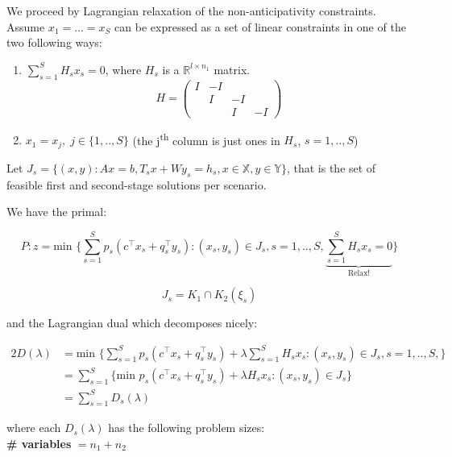 We proceed by Lagrangian relaxation of the non-anticipativity constraints.
Assume $x_1 = ...= x_S$ can be expressed as a set of linear constraints in one of the
two following ways:

\begin{enumerate}
\item $\sum_{s=1}^S H_sx_s = 0$, where $H_s$ is a $\mathbb{R}^{l\times n_1}$ matrix.
      \[ H = \left( \begin{array}{rrrr}
      I & -I &    & \\
        &  I & -I & \\
        &    &  I & -I \end{array} \right)\]
\item $x_1 = x_j,\; j\in \{1,..,S\}$ (the j\textsuperscript{th} column is just ones in $H_s$, $s=1,..,S$)
\end{enumerate}

Let $J_s = \{ (x,y) : Ax=b, T_s x + Wy_s = h_s, x \in \mathbb{X}, y\in \mathbb{Y} \}$, that is the set of
feasible first and second-stage solutions per scenario.

We have the primal:

\begin{equation}\label{eq:lgprimal}
P: z = \textrm{min }\{ \sum_{s=1}^S p_s (c^\top x_s + q_s^\top y_s) : (x_s, y_s) \in J_s, s=1,..,S, 
\underbrace{\sum_{s=1}^S H_sx_s = 0}_{\textrm{Relax!}}\}
\end{equation}

\begin{equation*}
J_s = K_1 \cap K_2(\xi_s)
\end{equation*}

and the Lagrangian dual which decomposes nicely:

\begin{alignat*}{2}
D(\lambda) & = \textrm{min }\{ \sum_{s=1}^S p_s (c^\top x_s + q_s^\top y_s) + \lambda\sum_{s=1}^S H_sx_s : (x_s, y_s) \in J_s, s=1,..,S,\} \\
& = \sum_{s=1}^S \{ \textrm{min } p_s (c^\top x_s + q_s^\top y_s) + \lambda H_sx_s : (x_s, y_s) \in J_s\}\\
& = \sum_{s=1}^S D_s(\lambda)
\end{alignat*}

where each $D_s(\lambda)$ has the following problem sizes:\\

\hspace{2cm} \textbf{\# variables} $ = n_1 + n_2$\\

